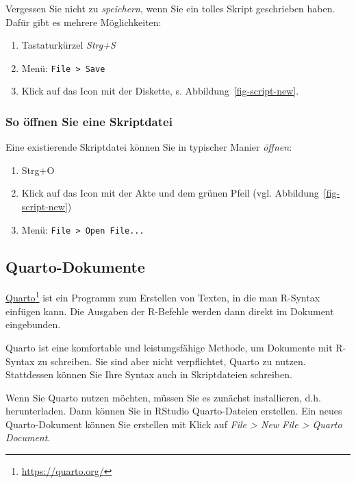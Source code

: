 \documentclass[
  letterpaper,
]{scrbook}
\providecommand{\tightlist}{%
  \setlength{\itemsep}{0pt}\setlength{\parskip}{0pt}}\usepackage{longtable,booktabs,array}
\theoremstyle{definition}
\theoremstyle{definition}
\theoremstyle{definition}
\theoremstyle{remark}
\begin{document}
Vergessen Sie nicht zu \emph{speichern}, wenn Sie ein tolles Skript
geschrieben haben. Dafür gibt es mehrere Möglichkeiten:

\begin{enumerate}
\def\labelenumi{\arabic{enumi}.}
\tightlist
\item
  Tastaturkürzel \emph{Strg+S}
\item
  Menü: \texttt{File\ \textgreater{}\ Save}
\item
  Klick auf das Icon mit der Diskette, s.
  Abbildung~\ref{fig-script-new}.
\end{enumerate}

\subsubsection{So öffnen Sie eine
Skriptdatei}\label{so-uxf6ffnen-sie-eine-skriptdatei}

Eine existierende Skriptdatei können Sie in typischer Manier
\emph{öffnen}:

\begin{enumerate}
\def\labelenumi{\arabic{enumi}.}
\tightlist
\item
  Strg+O
\item
  Klick auf das Icon mit der Akte und dem grünen Pfeil (vgl.
  Abbildung~\ref{fig-script-new})
\item
  Menü: \texttt{File\ \textgreater{}\ Open\ File...}
\end{enumerate}

\subsection{Quarto-Dokumente}\label{quarto-dokumente}

\href{https://quarto.org/}{Quarto}\footnote{\url{https://quarto.org/}}
ist ein Programm zum Erstellen von Texten, in die man R-Syntax einfügen
kann. Die Ausgaben der R-Befehle werden dann direkt im Dokument
eingebunden.

Quarto ist eine komfortable und leistungsfähige Methode, um Dokumente
mit R-Syntax zu schreiben. Sie sind aber nicht verpflichtet, Quarto zu
nutzen. Stattdessen können Sie Ihre Syntax auch in Skriptdateien
schreiben.

Wenn Sie Quarto nutzen möchten, müssen Sie es zunächst installieren,
d.h. herunterladen. Dann können Sie in RStudio Quarto-Dateien erstellen.
Ein neues Quarto-Dokument können Sie erstellen mit Klick auf \emph{File
\textgreater{} New File \textgreater{} Quarto Document}.
\end{document}
